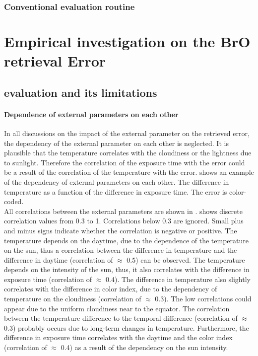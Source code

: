 \documentclass  [
  paper    = a4,
  BCOR     = 10mm,
  twoside,
  fontsize = 12pt,
  fleqn,
  toc      = bibnumbered,
  toc      = listofnumbered,
  numbers  = noendperiod,
  headings = normal,
  listof   = leveldown,
  version  = 3.03
]                                       {scrreprt}
\begin{document}
\section{Conventional evaluation routine\label{Chap:evalroutine}}


\part{Empirical investigation on the BrO retrieval Error}
\chapter{  evaluation and its limitations\label{Chap:5}}

\subsection*{Dependence of external parameters on each other}
In all discussions on the impact of the external parameter on the retrieved   error, the dependency of the external parameter on each other is neglected. It is plausible that the temperature correlates with the cloudiness or the lightness due to sunlight. Therefore the correlation of the exposure time with the   error could be a result of the correlation of the temperature with the   error.  shows an example of the dependency of external parameters on each other. The difference in temperature as a function of the difference in exposure time. The   error is color-coded. \\
All correlations between the external parameters are shown in .  shows discrete correlation values from 0.3 to 1. Correlations below 0.3 are ignored. Small plus and minus signs indicate whether the correlation is negative or positive. 
The temperature depends on the daytime, due to the dependence of the temperature on the sun, thus a correlation between the difference in temperature and the difference in daytime (correlation of $\approx$ 0.5) can be observed. The temperature depends on the intensity of the sun, thus, it also correlates with the difference in exposure time (correlation of $\approx$ 0.4). The difference in temperature also slightly correlates with the difference in color index, due to the dependency of temperature on the cloudiness (correlation of $\approx$ 0.3). The low correlations could appear due to the uniform cloudiness near to the equator. The correlation between the temperature difference to the temporal difference (correlation of $\approx$ 0.3) probably occurs due to long-term changes in temperature. Furthermore, the difference in exposure time correlates with the daytime and the color index (correlation of $\approx$ 0.4) as a result of the dependency on the sun intensity.\\
\end{document}
